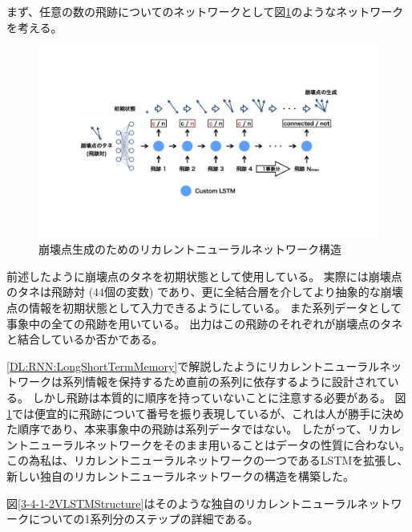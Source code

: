 まず、任意の数の飛跡についてのネットワークとして図\ref{3-4-1-1SimpleVLSTM}のようなネットワークを考える。

\begin{figure}[htbp]
 \centering
 \includegraphics[trim = 100 200 100 200, width=1.0\textwidth, clip]{Figure/3Networks/3-4-1-1SimpleVLSTM.png}
 \caption{崩壊点生成のためのリカレントニューラルネットワーク構造}
 \label{3-4-1-1SimpleVLSTM}
\end{figure}

前述したように崩壊点のタネを初期状態として使用している。
実際には崩壊点のタネは飛跡対 ($44$個の変数) であり、更に全結合層を介してより抽象的な崩壊点の情報を初期状態として入力できるようにしている。
また系列データとして事象中の全ての飛跡を用いている。
出力はこの飛跡のそれぞれが崩壊点のタネと結合しているか否かである。

\ref{DL:RNN:LongShortTermMemory}で解説したようにリカレントニューラルネットワークは系列情報を保持するため直前の系列に依存するように設計されている。
しかし飛跡は本質的に順序を持っていないことに注意する必要がある。
図\ref{3-4-1-1SimpleVLSTM}では便宜的に飛跡について番号を振り表現しているが、これは人が勝手に決めた順序であり、本来事象中の飛跡は系列データではない。
したがって、リカレントニューラルネットワークをそのまま用いることはデータの性質に合わない。
この為私は、リカレントニューラルネットワークの一つであるLSTMを拡張し、新しい独自のリカレントニューラルネットワークの構造を構築した。

図\ref{3-4-1-2VLSTMStructure}はそのような独自のリカレントニューラルネットワークについての1系列分のステップの詳細である。

